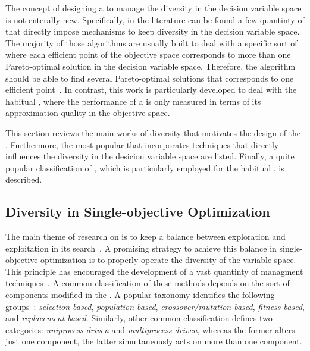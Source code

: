 The concept of designing a \MOEA{} to manage the diversity in the decision variable space is not enterally new.
%
Specifically, in the literature can be found a few quantinty of \MOEAS{} that directly impose mechanisms to keep diversity in the decision variable space.
%
The majority of those algorithms are usually built to deal with a specific sort of \MOPS{} where each efficient point of the objective space corresponds to more than one Pareto-optimal solution in the decision variable space.
%
Therefore, the algorithm should be able to find several Pareto-optimal solutions that corresponds to one efficient point~\cite{deb2008omni, cuate2019variation}.
%
In contrast, this work is particularly developed to deal with the habitual \MOPS{}, where the performance of a \MOEA{} is only measured in terms of its approximation quality in the objective space.
%

This section reviews the main works of diversity that motivates the design of the \VSDMOEAD{}.
%
Furthermore, the most popular \MOEAS{} that incorporates techniques that directly influences the diversity in the desicion variable space are listed.
%
Finally, a quite popular classification of \MOEAS{}, which is particularly employed for the habitual \MOPS{}, is described.

\subsection{Diversity in Single-objective Optimization}

The main theme of research on \EAS{} is to keep a balance between exploration and exploitation in its search~\cite{lin2009auto}.
%
A promising strategy to achieve this balance in single-objective optimization is to properly operate the diversity of the variable space.
%
This principle has encouraged the development of a vast quantinty of managment techniques~\cite{pandey2014comparative}.
%
A common classification of these methods depends on the sort of components modified in the \EA{}.
%
A popular taxonomy identifies the following groups~\cite{Joel:Crepinsek}: \textit{selection-based}, \textit{population-based}, \textit{crossover/mutation-based}, \textit{fitness-based}, and \textit{replacement-based}.
%
Similarly, other common classification defines two categories: \textit{uniprocess-driven} and \textit{multiprocess-driven}, whereas the former alters just one component, the latter simultaneously acts on more than one component.
%


